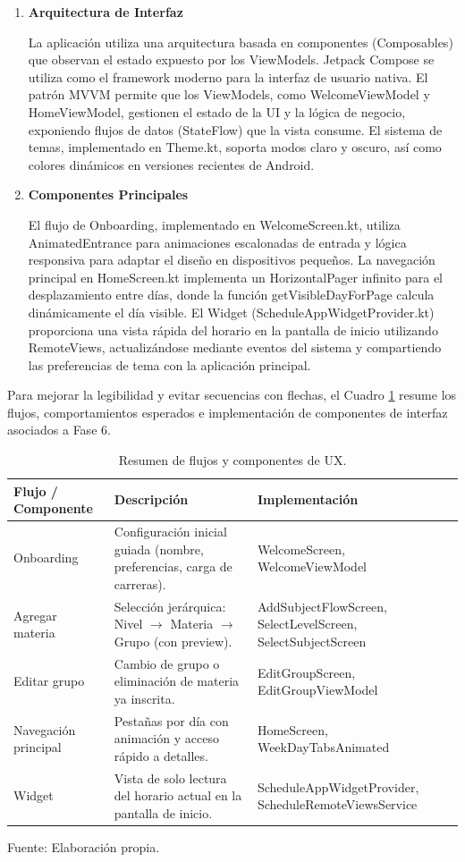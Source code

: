 \begin{enumerate}
    \item \textbf{Arquitectura de Interfaz}
    
    La aplicación utiliza una arquitectura basada en componentes (Composables) que observan el estado expuesto por los ViewModels. Jetpack Compose se utiliza como el framework moderno para la interfaz de usuario nativa. El patrón MVVM permite que los ViewModels, como WelcomeViewModel y HomeViewModel, gestionen el estado de la UI y la lógica de negocio, exponiendo flujos de datos (StateFlow) que la vista consume. El sistema de temas, implementado en Theme.kt, soporta modos claro y oscuro, así como colores dinámicos en versiones recientes de Android.

    \item \textbf{Componentes Principales}
    
    El flujo de Onboarding, implementado en WelcomeScreen.kt, utiliza AnimatedEntrance para animaciones escalonadas de entrada y lógica responsiva para adaptar el diseño en dispositivos pequeños.
    La navegación principal en HomeScreen.kt implementa un HorizontalPager infinito para el desplazamiento entre días, donde la función getVisibleDayForPage calcula dinámicamente el día visible.
    El Widget (ScheduleAppWidgetProvider.kt) proporciona una vista rápida del horario en la pantalla de inicio utilizando RemoteViews, actualizándose mediante eventos del sistema y compartiendo las preferencias de tema con la aplicación principal.
\end{enumerate}

Para mejorar la legibilidad y evitar secuencias con flechas, el Cuadro \ref{tab:f6_resumen_ux} resume los flujos, comportamientos esperados e implementación de componentes de interfaz asociados a Fase 6.

\begin{table}[H]
\centering
\begin{tabularx}{\linewidth}{@{}p{3.0cm}p{4.5cm}>{\RaggedRight\arraybackslash}X@{}}
\toprule
Flujo / Componente & Descripción & Implementación \\
\midrule
Onboarding & Configuración inicial guiada (nombre, preferencias, carga de carreras). & WelcomeScreen, WelcomeViewModel \\
Agregar materia & Selección jerárquica: Nivel $\rightarrow$ Materia $\rightarrow$ Grupo (con preview). & AddSubjectFlowScreen, SelectLevelScreen, SelectSubjectScreen \\
Editar grupo & Cambio de grupo o eliminación de materia ya inscrita. & EditGroupScreen, EditGroupViewModel \\
Navegación principal & Pestañas por día con animación y acceso rápido a detalles. & HomeScreen, WeekDayTabsAnimated \\
Widget & Vista de solo lectura del horario actual en la pantalla de inicio. & ScheduleAppWidgetProvider, ScheduleRemoteViewsService \\
\bottomrule
\end{tabularx}
\caption{Resumen de flujos y componentes de UX.}\label{tab:f6_resumen_ux}
Fuente: Elaboración propia.
\end{table}

